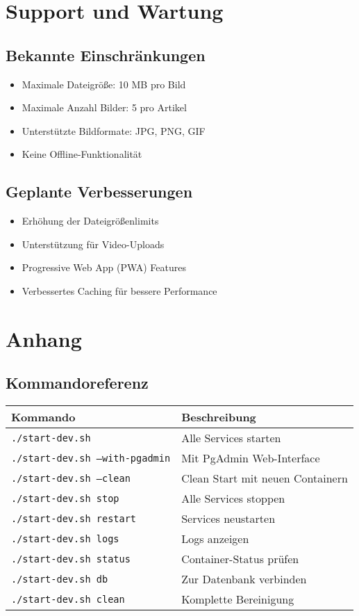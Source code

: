 \documentclass[a4paper,12pt]{article}
\begin{document}
\section{Support und Wartung}

\subsection{Bekannte Einschränkungen}
\begin{itemize}
    \item Maximale Dateigröße: 10 MB pro Bild
    \item Maximale Anzahl Bilder: 5 pro Artikel
    \item Unterstützte Bildformate: JPG, PNG, GIF
    \item Keine Offline-Funktionalität
\end{itemize}

\subsection{Geplante Verbesserungen}
\begin{itemize}
    \item Erhöhung der Dateigrößenlimits
    \item Unterstützung für Video-Uploads
    \item Progressive Web App (PWA) Features
    \item Verbessertes Caching für bessere Performance
\end{itemize}

\section{Anhang}

\subsection{Kommandoreferenz}
\begin{longtable}{|p{}|p{}|}
\hline
\textbf{Kommando} & \textbf{Beschreibung} \\
\hline
\texttt{./start-dev.sh} & Alle Services starten \\
\hline
\texttt{./start-dev.sh --with-pgadmin} & Mit PgAdmin Web-Interface \\
\hline
\texttt{./start-dev.sh --clean} & Clean Start mit neuen Containern \\
\hline
\texttt{./start-dev.sh stop} & Alle Services stoppen \\
\hline
\texttt{./start-dev.sh restart} & Services neustarten \\
\hline
\texttt{./start-dev.sh logs} & Logs anzeigen \\
\hline
\texttt{./start-dev.sh status} & Container-Status prüfen \\
\hline
\texttt{./start-dev.sh db} & Zur Datenbank verbinden \\
\hline
\texttt{./start-dev.sh clean} & Komplette Bereinigung \\
\hline
\end{longtable}
\end{document}
